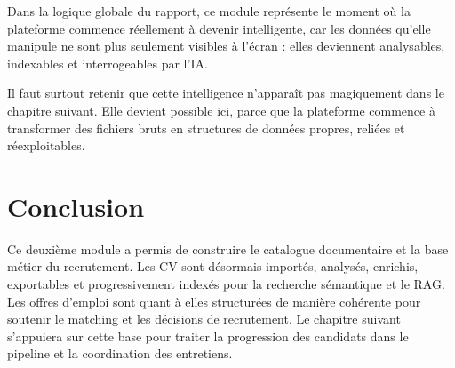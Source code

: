 Dans la logique globale du rapport, ce module représente le moment où la plateforme commence réellement à devenir intelligente, car les données qu'elle manipule ne sont plus seulement visibles à l'écran : elles deviennent analysables, indexables et interrogeables par l'IA.

Il faut surtout retenir que cette intelligence n'apparaît pas magiquement dans le chapitre suivant. Elle devient possible ici, parce que la plateforme commence à transformer des fichiers bruts en structures de données propres, reliées et réexploitables.

\section*{Conclusion}
Ce deuxième module a permis de construire le catalogue documentaire et la base métier du recrutement. Les CV sont désormais importés, analysés, enrichis, exportables et progressivement indexés pour la recherche sémantique et le RAG. Les offres d'emploi sont quant à elles structurées de manière cohérente pour soutenir le matching et les décisions de recrutement. Le chapitre suivant s'appuiera sur cette base pour traiter la progression des candidats dans le pipeline et la coordination des entretiens.
